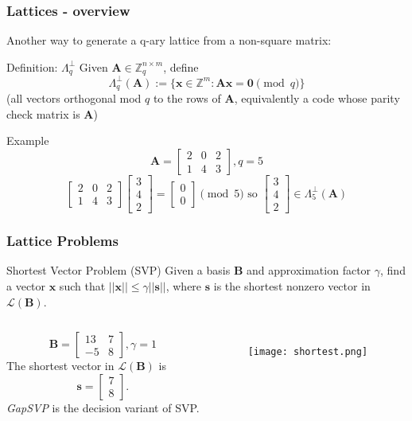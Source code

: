 \documentclass{beamer}
\renewcommand{\v}{\mathbf}
\begin{document}
\begin{frame}
\frametitle{Lattices - overview}
Another way to generate a q-ary lattice from a non-square matrix:
\begin{block}{Definition: $\Lambda_q^\perp$}
Given $\v{A} \in \mathbb{Z}_q^{n \times m}$, define
\begin{equation*}
    \Lambda_q^\perp(\v{A}) := \{\v{x} \in \mathbb{Z}^m: \v{Ax} = \v{0}
        \pmod{q}
    \}
\end{equation*}
(all vectors orthogonal mod $q$ to the rows of $\v{A}$, equivalently
a code whose parity check matrix is $\v{A}$)
\end{block}
\begin{block}{Example}
\begin{equation*}
    \v{A} = \begin{bmatrix} 2 & 0 & 2 \\ 1 & 4 & 3 \end{bmatrix}, q=5
\end{equation*}
\begin{equation*}
    \begin{bmatrix} 2 & 0 & 2 \\ 1 & 4 & 3 \end{bmatrix}
    \begin{bmatrix} 3 \\ 4 \\ 2 \end{bmatrix}
    = \begin{bmatrix} 0 \\ 0 \end{bmatrix} \pmod{5}
    \text{ so } \begin{bmatrix} 3 \\ 4 \\ 2 \end{bmatrix} \in 
    \Lambda_5^\perp(\v{A})
\end{equation*}
\end{block}
\end{frame}

\begin{frame}
\frametitle{Lattice Problems}
\begin{block}{Shortest Vector Problem (SVP)}
Given a basis $\v{B}$ and approximation factor $\gamma$, find a vector 
$\v{x}$ such that $||\v{x}|| \leq \gamma||\v{s}||$, where $\v{s}$ is
the shortest nonzero vector in $\mathcal{L}(\v{B})$.
\end{block}
\begin{columns}
\[
    \v{B} = \begin{bmatrix}13 & 7 \\ -5 & 8 \end{bmatrix},
    \gamma = 1
\]
The shortest vector in $\mathcal{L}(\v{B})$ is
\[
    \v{s} = \begin{bmatrix} 7 \\ 8 \end{bmatrix}.
\]
\textit{GapSVP} is the decision variant of SVP.
\begin{figure}
    \texttt{[image: shortest.png]}
\end{figure}
\end{columns}
\end{frame}
\end{document}
